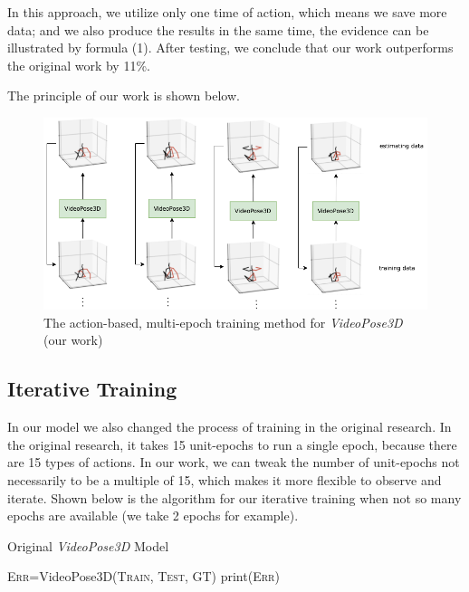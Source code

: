 \documentclass[10pt,twocolumn,letterpaper]{article}
\begin{document}
In this approach, we utilize only one time of action, which means we save more data; and we also produce
the results in the same time, the evidence can be illustrated by formula (1). After testing, we conclude 
that our work outperforms the original work by 11\%.

The principle of our work is shown below.


\begin{figure}[H]
	\begin{center}
  		\includegraphics[width=0.9\linewidth]{new_model.png}
	\end{center}
   	\caption{The action-based, multi-epoch training method for \textit{VideoPose3D} (our work)}
	\label{fig:long}
	\label{fig:onecol}
\end{figure}



\subsection{Iterative Training}

In our model we also changed the process of training in the original research. In the original research,
it takes 15 unit-epochs to run a single epoch, because there are 15 types of actions. In our work, we can
tweak the number of unit-epochs not necessarily to be a multiple of 15, which makes it more flexible to 
observe and iterate. Shown below is the algorithm for our iterative training when not so many epochs are 
available (we take 2 epochs for example).


\begin{algorithm}
  \caption{Original \textit{VideoPose3D} Model}
  \SetAlgoLined
  
  
  	{
 		\textsc{Err}=VideoPose3D(\textsc{Train, Test, GT})\;
  		print(\textsc{Err})\;
  		
  	}
  
 \;
\end{algorithm}
\end{document}
